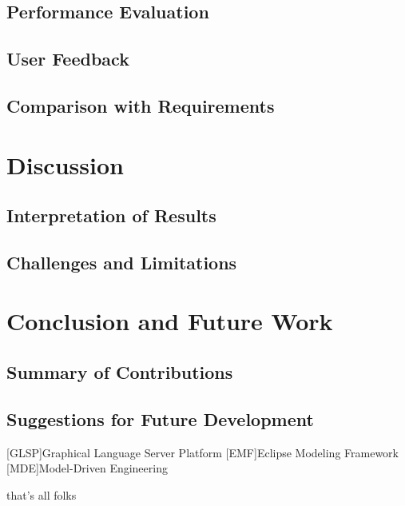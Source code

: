 \documentclass[conference, onecolumn]{IEEEtran}
\begin{document}
  \subsection{Performance Evaluation}
  \label{subsec:performance-evaluation}

  \subsection{User Feedback}
  \label{subsec:user-feedback}

  \subsection{Comparison with Requirements}
  \label{subsec:comparison-requirements}

  \section{Discussion}
  \label{sec:discussion}

  \subsection{Interpretation of Results}
  \label{subsec:interpretation-results}

  \subsection{Challenges and Limitations}
  \label{subsec:challenges-limitations}

  \section{Conclusion and Future Work}
  \label{sec:conclusion}

  \subsection{Summary of Contributions}
  \label{subsec:summary-contributions}

  \subsection{Suggestions for Future Development}
  \label{subsec:suggestions-future-development}

  \printbibliography

\begin{acronym}
  [GLSP]{Graphical Language Server Platform}
  [EMF]{Eclipse Modeling Framework}
  [MDE]{Model-Driven Engineering}
\end{acronym}

that's all folks
\end{document}
